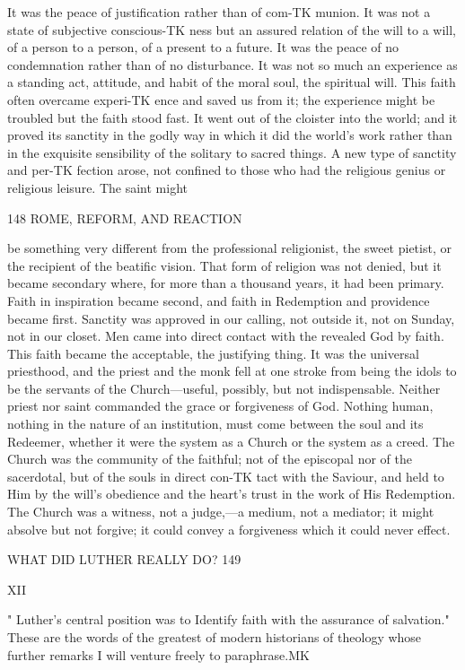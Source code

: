 \documentclass[12pt,a5paper,oneside]{book}
\begin{document}
{It was the peace of justification rather than of com-TK
munion. It was not a state of subjective conscious-TK
ness but an assured relation of the will to a will, of 
a person to a person, of a present to a future. It 
was the peace of no condemnation rather than of no 
disturbance. It was not so much an experience as 
a standing act, attitude, and habit of the moral soul, 
the spiritual will. This faith often overcame experi-TK
ence and saved us from it; the experience might be 
troubled but the faith stood fast. It went out of 
the cloister into the world; and it proved its sanctity 
in the godly way in which it did the world's work 
rather than in the exquisite sensibility of the solitary 
to sacred things. A new type of sanctity and per-TK
fection arose, not confined to those who had the 
religious genius or religious leisure. The saint might 



148 ROME, REFORM, AND REACTION 

be something very different from the professional 
religionist, the sweet pietist, or the recipient of the 
beatific vision. That form of religion was not 
denied, but it became secondary where, for more 
than a thousand years, it had been primary. Faith 
in inspiration became second, and faith in Redemption 
and providence became first. Sanctity was approved 
in our calling, not outside it, not on Sunday, not in 
our closet. Men came into direct contact with 
the revealed God by faith. This faith became the 
acceptable, the justifying thing. It was the universal 
priesthood, and the priest and the monk fell at one 
stroke from being the idols to be the servants of 
the Church---useful, possibly, but not indispensable. 
Neither priest nor saint commanded the grace or 
forgiveness of God. Nothing human, nothing in the 
nature of an institution, must come between the soul 
and its Redeemer, whether it were the system as a 
Church or the system as a creed. The Church was 
the community of the faithful; not of the episcopal 
nor of the sacerdotal, but of the souls in direct con-TK
tact with the Saviour, and held to Him by the will's 
obedience and the heart's trust in the work of His 
Redemption. The Church was a witness, not a 
judge,---a medium, not a mediator; it might absolve 
but not forgive; it could convey a forgiveness which 
it could never effect. 



WHAT DID LUTHER REALLY DO? 149 

XII 

" Luther's central position was to Identify faith with 
the assurance of salvation." These are the words of 
the greatest of modern historians of theology whose 
further remarks I will venture freely to paraphrase.MK 

}
\end{document}
